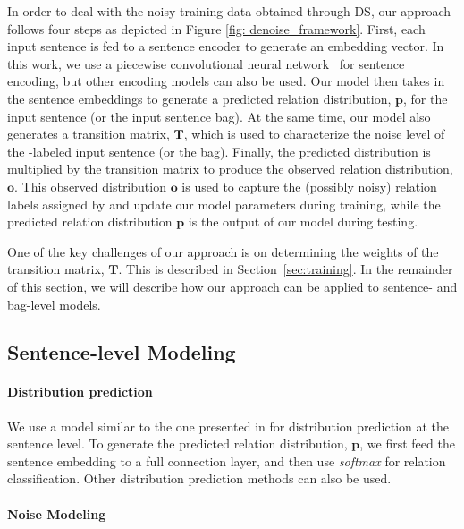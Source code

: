 In order to deal with the noisy training data obtained through DS, our approach follows four steps as depicted in Figure \ref{fig: denoise_framework}.
First, each input sentence is fed to a sentence encoder to generate an embedding vector. In this work, we
use a piecewise convolutional neural network~\cite{zeng2015distant} for sentence encoding, but other encoding models can
also be used. Our model then takes in the sentence embeddings to generate a predicted relation
distribution, $\mathbf{p}$, for the input sentence (or the input sentence bag). At the same time, our model also generates
a transition matrix, $\mathbf{T}$, which is used to characterize the noise level of the \DS-labeled input sentence (or the
bag). Finally, the predicted distribution is multiplied by the transition matrix to produce the observed relation
distribution, $\mathbf{o}$. This observed distribution $\mathbf{o}$ is used to capture the (possibly noisy) relation labels
assigned by \DS and update our model parameters during training, while the predicted relation distribution $\mathbf{p}$ is
the output of our model during testing.


One of the key challenges of our approach is
on determining the weights of the transition matrix, $\mathbf{T}$. This is described in Section~\ref{sec:training}.
In the remainder of this section, we will describe how our approach can be
applied to sentence- and bag-level models.



\subsection{Sentence-level Modeling}
\paragraph{Distribution prediction}
We use a model similar to the one presented in \cite{luo2016temporal} for distribution prediction at the sentence level. To generate the
predicted relation distribution, $\mathbf{p}$,  we first feed the sentence embedding to a full connection layer, and then use \emph{softmax} for
relation classification. Other distribution prediction methods can also be used. 

\paragraph{Noise Modeling}

